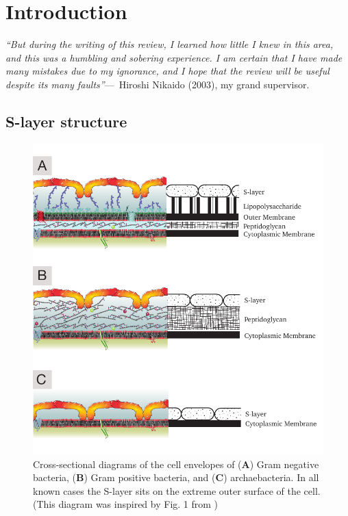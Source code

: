 
\acresetall{}

\chapter{Introduction}
\label{ch:Introduction}

    \begin{epigraph}
            \emph{``But during the writing of this review, I learned how little I knew in this area, and this was a humbling and sobering experience. I am certain that I have made many mistakes due to my ignorance, and I hope that the review will be useful despite its many faults''}---~Hiroshi Nikaido (2003), my grand supervisor.
    \end{epigraph}
    \section{S-layer structure} %
    \label{sec:s_layer_structure}
    
        \begin{figure}[p] %
                \begin{center}
                    \includegraphics{intro/img/celwalls.pdf}
                \end{center}
                \caption[Cross-sectional diagrams of \ac{S-layer} containing cell envelopes]{Cross-sectional diagrams of the cell envelopes of (\textbf{A}) Gram negative bacteria, (\textbf{B}) Gram positive bacteria, and (\textbf{C}) archaebacteria. In all known cases the \ac{S-layer} sits on the extreme outer surface of the cell. (This diagram was inspired by Fig. 1 from )}
            \label{fig:cellwalls}
        \end{figure}

